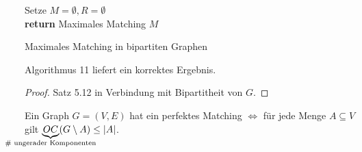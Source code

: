 \begin{algorithm}
	\vspace*{5pt}
	Setze $M=\emptyset, R=\emptyset$\\
	\textbf{return} Maximales Matching $M$
	\caption{Maximales Matching in bipartiten Graphen}
	\label{fig:Algorithmus}
\end{algorithm}
\begin{satz}
	Algorithmus 11 liefert ein korrektes Ergebnis.
\end{satz}
\begin{proof}
	Satz 5.12 in Verbindung mit Bipartitheit von $G$.
\end{proof}
\begin{satz}
	Ein Graph $G=(V,E)$ hat ein perfektes Matching $\Leftrightarrow$ für jede Menge $A \subseteq V$ gilt $\underbrace{OC}_{\mathclap{\text{\# ungerader Komponenten}}}(G\setminus A) \le \card{A}$.
\end{satz}
